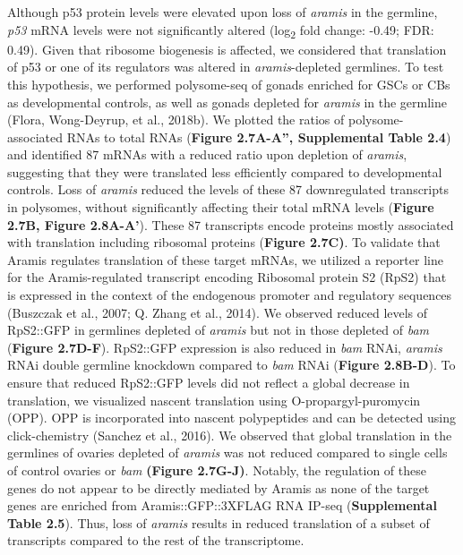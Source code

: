 \documentclass[12pt,oneside]{reedthesis}
\begin{document}
Although p53 protein levels were elevated upon loss of \emph{aramis} in the germline, \emph{p53} mRNA levels were not significantly altered (log\textsubscript{2} fold change: -0.49; FDR: 0.49). Given that ribosome biogenesis is affected, we considered that translation of p53 or one of its regulators was altered in \emph{aramis}-depleted germlines. To test this hypothesis, we performed polysome-seq of gonads enriched for GSCs or CBs as developmental controls, as well as gonads depleted for \emph{aramis} in the germline (Flora, Wong-Deyrup, et al., 2018b). We plotted the ratios of polysome-associated RNAs to total RNAs (\textbf{Figure 2.7A-A'', Supplemental Table 2.4}) and identified 87 mRNAs with a reduced ratio upon depletion of \emph{aramis}, suggesting that they were translated less efficiently compared to developmental controls. Loss of \emph{aramis} reduced the levels of these 87 downregulated transcripts in polysomes, without significantly affecting their total mRNA levels (\textbf{Figure 2.7B, Figure 2.8A-A'}). These 87 transcripts encode proteins mostly associated with translation including ribosomal proteins (\textbf{Figure 2.7C)}. To validate that Aramis regulates translation of these target mRNAs, we utilized a reporter line for the Aramis-regulated transcript encoding Ribosomal protein S2 (RpS2) that is expressed in the context of the endogenous promoter and regulatory sequences (Buszczak et al., 2007; Q. Zhang et al., 2014). We observed reduced levels of RpS2::GFP in germlines depleted of \emph{aramis} but not in those depleted of \emph{bam} (\textbf{Figure 2.7D-F}). RpS2::GFP expression is also reduced in \emph{bam} RNAi, \emph{aramis} RNAi double germline knockdown compared to \emph{bam} RNAi (\textbf{Figure 2.8B-D}). To ensure that reduced RpS2::GFP levels did not reflect a global decrease in translation, we visualized nascent translation using O-propargyl-puromycin (OPP). OPP is incorporated into nascent polypeptides and can be detected using click-chemistry (Sanchez et al., 2016). We observed that global translation in the germlines of ovaries depleted of \emph{aramis} was not reduced compared to single cells of control ovaries or \emph{bam} \textbf{(Figure 2.7G-J)}. Notably, the regulation of these genes do not appear to be directly mediated by Aramis as none of the target genes are enriched from Aramis::GFP::3XFLAG RNA IP-seq (\textbf{Supplemental Table 2.5}). Thus, loss of \emph{aramis} results in reduced translation of a subset of transcripts compared to the rest of the transcriptome.
\end{document}
